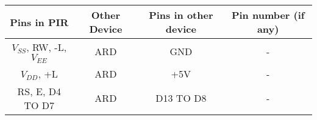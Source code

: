 

\begin{table}[H]
\centering
  \begin{tabular}{|c|c|c|c|}
    \hline
    \textbf{Pins in PIR} & \textbf{Other Device} & \textbf{Pins in other device} & \textbf{Pin number (if any)} \\
    \hline
     $V_{SS}$, RW, -L, $V_{EE}$ & ARD & GND & - \\
    \hline
    $V_{DD}$, +L & ARD & +5V & -  \\
    \hline
    RS, E, D4 TO D7 & ARD & D13 TO D8 & - \\
    \hline
  \end{tabular}
\end{table}
